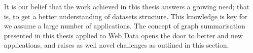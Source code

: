 It is our belief that the work achieved in this thesis answers a growing need; that is, to get a better understanding of datasets structure. This knowledge is key for we assume a large number of applications. The concept of graph summarisation presented in this thesis applied to Web Data opens the door to better and new applications, and raises as well novel challenges as outlined in this section.

